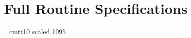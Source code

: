 \section {Full Routine Specifications}

\renewcommand{\_}{{\tt\char'137}}

\newlength{\sstbannerlength}
\newlength{\sstcaptionlength}

\font\ssttt=cmtt10 scaled 1095

\newcommand{\sstroutine}[3]{
   \goodbreak
   \rule{\textwidth}{0.5mm}
   \vspace{-7ex}
   \newline
   \settowidth{\sstbannerlength}{{\Large {\bf #1}}}
   \setlength{\sstcaptionlength}{\textwidth}
   \addtolength{\sstbannerlength}{0.5em}
   \addtolength{\sstcaptionlength}{-2.0\sstbannerlength}
   \addtolength{\sstcaptionlength}{-4.45pt}
   \parbox[t]{\sstbannerlength}{\flushleft{\Large {\bf #1}}}
   \parbox[t]{\sstcaptionlength}{\center{\Large #2}}
   \parbox[t]{\sstbannerlength}{\flushright{\Large {\bf #1}}}
   \begin{description}
      #3
   \end{description}
}

\newcommand{\sstdescription}[1]{\item[Description:] #1}

\newcommand{\sstusage}[1]{\item[Usage:] \mbox{} \\[1.3ex] {\ssttt #1}}

\newcommand{\sstinvocation}[1]{\item[Invocation:]\hspace{0.4em}{\tt #1}}

\newcommand{\sstarguments}[1]{
   \item[Arguments:] \mbox{} \\
   \vspace{-3.5ex}
   \begin{description}
      #1
   \end{description}
}

\newcommand{\sstreturnedvalue}[1]{
   \item[Returned Value:] \mbox{} \\
   \vspace{-3.5ex}
   \begin{description}
      #1
   \end{description}
}


